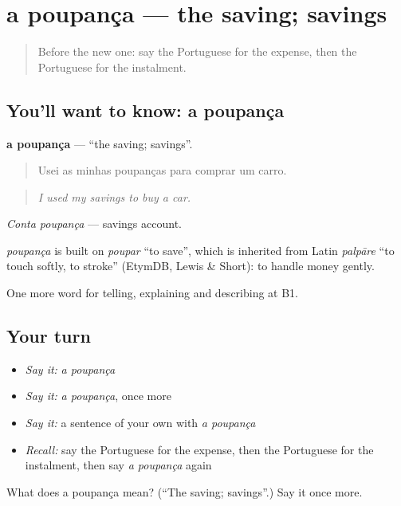 \section[a poupança]{a poupança — the saving; savings}

\label{lesson:PT-C391-poupanca}



\begin{quote}
Before the new one: say the Portuguese for the expense, then the Portuguese for the instalment.
\end{quote}

\subsection*{You'll want to know: a poupança}
\textbf{a poupança} — \textquotedblleft{}the saving; savings\textquotedblright{}.

\begin{quote}
Usei as minhas poupanças para comprar um carro.
\end{quote}

\begin{quote}
\emph{I used my savings to buy a car.}
\end{quote}

\emph{Conta poupança} — savings account.

\begin{cousinweb}
\emph{poupança} is built on \emph{poupar} \textquotedblleft{}to save\textquotedblright{}, which is inherited from Latin \emph{palpāre} \textquotedblleft{}to touch softly, to stroke\textquotedblright{} (EtymDB, Lewis \& Short): to handle money gently.
\end{cousinweb}

\begin{grammarlens}[title={What you've built}]
One more word for telling, explaining and describing at B1.
\end{grammarlens}

\subsection*{Your turn}
\begin{itemize}
\raggedright
  \item \emph{Say it:} \emph{a poupança}
  \item \emph{Say it:} \emph{a poupança}, once more
  \item \emph{Say it:} a sentence of your own with \emph{a poupança}
  \item \emph{Recall:} say the Portuguese for the expense, then the Portuguese for the instalment, then say \emph{a poupança} again
\end{itemize}

\begin{tcolorbox}[breakable,colback=teal!4,colframe=teal!35!black,title={Before you move on}]
What does a poupança mean? (\textquotedblleft{}The saving; savings\textquotedblright{}.) Say it once more.
\end{tcolorbox}
